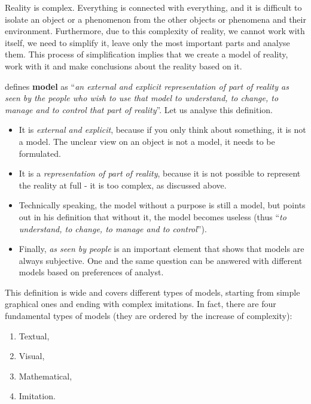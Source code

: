 \documentclass[
]{book}
\providecommand{\tightlist}{%
  \setlength{\itemsep}{0pt}\setlength{\parskip}{0pt}}
\theoremstyle{definition}
\theoremstyle{definition}
\theoremstyle{definition}
\theoremstyle{definition}
\theoremstyle{remark}
\begin{document}
Reality is complex. Everything is connected with everything, and it is difficult to isolate an object or a phenomenon from the other objects or phenomena and their environment. Furthermore, due to this complexity of reality, we cannot work with itself, we need to simplify it, leave only the most important parts and analyse them. This process of simplification implies that we create a model of reality, work with it and make conclusions about the reality based on it.

\citet{Pidd2010} defines \textbf{model} as ``\emph{an external and explicit representation of part of reality as seen by the people who wish to use that model to understand, to change, to manage and to control that part of reality}''. Let us analyse this definition.

\begin{itemize}
\tightlist
\item
  It is \emph{external and explicit}, because if you only think about something, it is not a model. The unclear view on an object is not a model, it needs to be formulated.
\item
  It is a \emph{representation of part of reality}, because it is not possible to represent the reality at full - it is too complex, as discussed above.
\item
  Technically speaking, the model without a purpose is still a model, but \citet{Pidd2010} points out in his definition that without it, the model becomes useless (thus ``\emph{to understand, to change, to manage and to control}'').
\item
  Finally, \emph{as seen by people} is an important element that shows that models are always subjective. One and the same question can be answered with different models based on preferences of analyst.
\end{itemize}

This definition is wide and covers different types of models, starting from simple graphical ones and ending with complex imitations. In fact, there are four fundamental types of models (they are ordered by the increase of complexity):

\begin{enumerate}
\def\labelenumi{\arabic{enumi}.}
\tightlist
\item
  Textual,
\item
  Visual,
\item
  Mathematical,
\item
  Imitation.
\end{enumerate}
\end{document}
